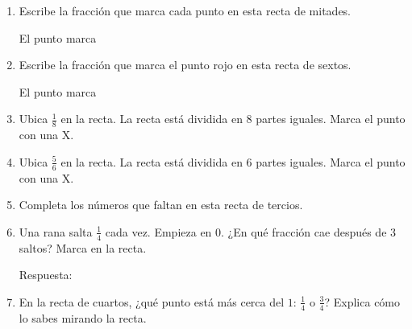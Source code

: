 \begin{wbpractice}
\begin{enumerate}
\item Escribe la fracción que marca cada punto en esta recta de mitades.
\begin{center}
\end{center}
El punto marca \wbfracbox
{}

\item Escribe la fracción que marca el punto rojo en esta recta de sextos.
\begin{center}
\end{center}
El punto marca \wbfracbox
{}

\item Ubica $\frac{1}{8}$ en la recta. La recta está dividida en 8 partes iguales. Marca el punto con una X.
\begin{center}
\end{center}
\wbbox[1cm]

\item Ubica $\frac{5}{6}$ en la recta. La recta está dividida en 6 partes iguales. Marca el punto con una X.
\begin{center}
\end{center}
\wbbox[1cm]

\item Completa los números que faltan en esta recta de tercios.
\begin{center}
\end{center}

\item Una rana salta $\frac{1}{4}$ cada vez. Empieza en $0$. ¿En qué fracción cae después de 3 saltos? Marca en la recta.
\begin{center}
\end{center}
Respuesta: \wbfracbox
{}

\item En la recta de cuartos, ¿qué punto está más cerca del $1$: $\frac{1}{4}$ o $\frac{3}{4}$? Explica cómo lo sabes mirando la recta.
\begin{center}
\end{center}
\end{enumerate}
\end{wbpractice}

